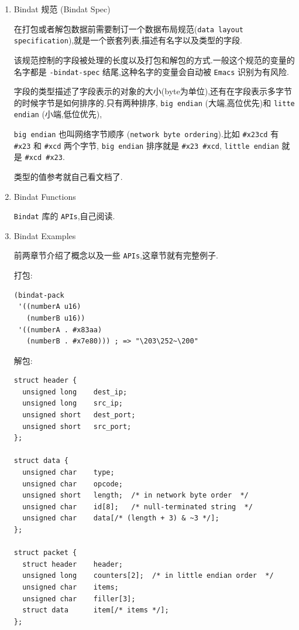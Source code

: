 \documentclass[11pt]{article}
\begin{document}
\begin{enumerate}
\item Bindat 规范 (Bindat Spec)
\label{sec:org27bf0cb}

在打包或者解包数据前需要制订一个数据布局规范(\texttt{data layout specification}),就是一个嵌套列表,描述有名字以及类型的字段.

该规范控制的字段被处理的长度以及打包和解包的方式.一般这个规范的变量的名字都是 \texttt{-bindat-spec} 结尾,这种名字的变量会自动被 \texttt{Emacs} 识别为有风险.

字段的类型描述了字段表示的对象的大小(byte为单位),还有在字段表示多字节的时候字节是如何排序的.只有两种排序, \texttt{big endian} (大端,高位优先)和 \texttt{litte endian} (小端,低位优先),

\texttt{big endian} 也叫网络字节顺序 (\texttt{network byte ordering}).比如 \texttt{\#x23cd} 有 \texttt{\#x23} 和 \texttt{\#xcd} 两个字节, \texttt{big endian} 排序就是 \texttt{\#x23 \#xcd}, \texttt{little endian} 就是 \texttt{\#xcd \#x23}.

类型的值参考就自己看文档了.



\item Bindat Functions
\label{sec:org534f1d2}

\texttt{Bindat} 库的 \texttt{APIs},自己阅读.


\item Bindat Examples
\label{sec:org4766438}

前两章节介绍了概念以及一些 \texttt{APIs},这章节就有完整例子.

打包:

\begin{verbatim}
(bindat-pack
 '((numberA u16)
   (numberB u16))
 '((numberA . #x83aa)
   (numberB . #x7e80))) ; => "\203\252~\200"
\end{verbatim}



解包:

\begin{verbatim}
struct header {
  unsigned long    dest_ip;
  unsigned long    src_ip;
  unsigned short   dest_port;
  unsigned short   src_port;
};

struct data {
  unsigned char    type;
  unsigned char    opcode;
  unsigned short   length;  /* in network byte order  */
  unsigned char    id[8];   /* null-terminated string  */
  unsigned char    data[/* (length + 3) & ~3 */];
};

struct packet {
  struct header    header;
  unsigned long    counters[2];  /* in little endian order  */
  unsigned char    items;
  unsigned char    filler[3];
  struct data      item[/* items */];
};
\end{verbatim}


\end{enumerate}
\end{document}
